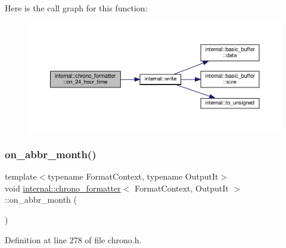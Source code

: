 Here is the call graph for this function\+:
\nopagebreak
\begin{figure}[H]
\begin{center}
\leavevmode
\includegraphics[width=350pt]{structinternal_1_1chrono__formatter_a5c9271dd72f0802191c6adfaeae8a1dc_cgraph}
\end{center}
\end{figure}
\mbox{\label{structinternal_1_1chrono__formatter_a10d11ac67861dc43c271099981cba98d}} 
\subsubsection{\texorpdfstring{on\+\_\+abbr\+\_\+month()}{on\_abbr\_month()}}
{\footnotesize\ttfamily template$<$typename Format\+Context, typename Output\+It$>$ \\
void \hyperlink{structinternal_1_1chrono__formatter}{internal\+::chrono\+\_\+formatter}$<$ Format\+Context, Output\+It $>$\+::on\+\_\+abbr\+\_\+month (\begin{DoxyParamCaption}{ }\end{DoxyParamCaption})\hspace{0.3cm}{\ttfamily [inline]}}



Definition at line 278 of file chrono.\+h.

\mbox{\label{structinternal_1_1chrono__formatter_ae4ff1cb66bff2a9bd2b01e8f560cb7d5}} 

